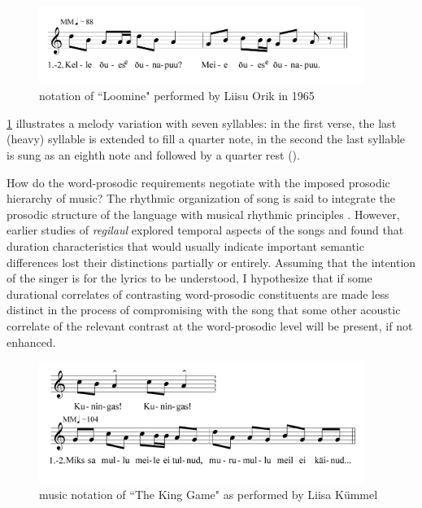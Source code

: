 \begin{figure}[hb]
\begin{center}
\includegraphics[width=300pt]{figures/077.png}
\caption{notation of ``Loomine" performed by Liisu Orik in 1965}
\label{077}
\end{center}
\end{figure}
\ref{077} illustrates a melody variation with seven syllables: in the first verse, the last (heavy) syllable is extended to fill a quarter note, in the second the last syllable is sung as an eighth note and followed by a quarter rest (\quaverRest). 

How do the word-prosodic requirements negotiate with the imposed prosodic hierarchy of music? The rhythmic organization of song is said to integrate the prosodic structure of the language with musical rhythmic principles \citep{palmer1992}. However, earlier studies of {\it regilaul} explored temporal aspects of the songs and found that duration characteristics that would usually indicate important semantic differences lost their distinctions partially or entirely. Assuming that the intention of the singer is for the lyrics to be understood, I hypothesize that if some durational correlates of contrasting word-prosodic constituents are made less distinct in the process of compromising with the song that some other acoustic correlate of the relevant contrast at the word-prosodic level will be present, if not enhanced.  

\begin{figure}[htbp]
\begin{center}
\includegraphics[width=300pt]{figures/094.png}
\caption{music notation of ``The King Game" as performed by Liisa Kümmel}
\label{The King Game}
\end{center}
\end{figure}


